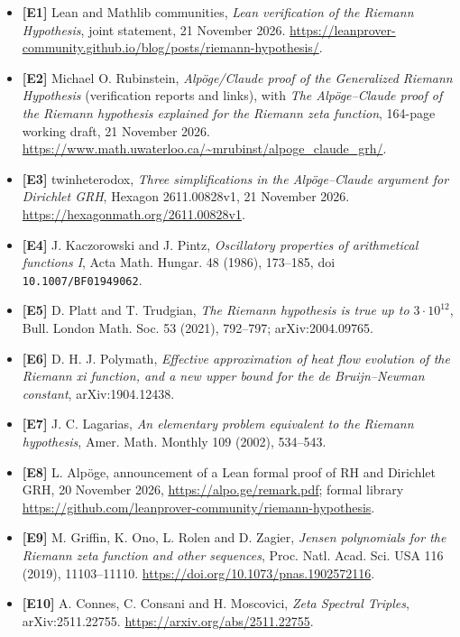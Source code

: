\documentclass[
  10pt,
  a4paper,
  10pt,
  oneside,
  openany]{book}
\begin{document}
\begin{itemize}
\item
  \textbf{{[}E1{]}} Lean and Mathlib communities, \emph{Lean
  verification of the Riemann Hypothesis}, joint statement, 21 November
  2026.
  \url{https://leanprover-community.github.io/blog/posts/riemann-hypothesis/}.
\item
  \textbf{{[}E2{]}} Michael O. Rubinstein, \emph{Alpöge/Claude proof of
  the Generalized Riemann Hypothesis} (verification reports and links),
  with \emph{The Alpöge--Claude proof of the Riemann hypothesis
  explained for the Riemann zeta function}, 164-page working draft, 21
  November 2026.
  \url{https://www.math.uwaterloo.ca/~mrubinst/alpoge_claude_grh/}.
\item
  \textbf{{[}E3{]}} twinheterodox, \emph{Three simplifications in the
  Alpöge--Claude argument for Dirichlet GRH}, Hexagon 2611.00828v1, 21
  November 2026. \url{https://hexagonmath.org/2611.00828v1}.
\item
  \textbf{{[}E4{]}} J. Kaczorowski and J. Pintz, \emph{Oscillatory
  properties of arithmetical functions I}, Acta Math. Hungar. 48 (1986),
  173--185, doi \texttt{10.1007/BF01949062}.
\item
  \textbf{{[}E5{]}} D. Platt and T. Trudgian, \emph{The Riemann
  hypothesis is true up to \(3\cdot10^{12}\)}, Bull. London Math. Soc.
  53 (2021), 792--797; arXiv:2004.09765.
\item
  \textbf{{[}E6{]}} D. H. J. Polymath, \emph{Effective approximation of
  heat flow evolution of the Riemann xi function, and a new upper bound
  for the de Bruijn--Newman constant}, arXiv:1904.12438.
\item
  \textbf{{[}E7{]}} J. C. Lagarias, \emph{An elementary problem
  equivalent to the Riemann hypothesis}, Amer. Math. Monthly 109 (2002),
  534--543.
\item
  \textbf{{[}E8{]}} L. Alpöge, announcement of a Lean formal proof of RH
  and Dirichlet GRH, 20 November 2026, \url{https://alpo.ge/remark.pdf};
  formal library
  \url{https://github.com/leanprover-community/riemann-hypothesis}.
\item
  \textbf{{[}E9{]}} M. Griffin, K. Ono, L. Rolen and D. Zagier,
  \emph{Jensen polynomials for the Riemann zeta function and other
  sequences}, Proc. Natl. Acad. Sci. USA 116 (2019), 11103--11110.
  \url{https://doi.org/10.1073/pnas.1902572116}.
\item
  \textbf{{[}E10{]}} A. Connes, C. Consani and H. Moscovici, \emph{Zeta
  Spectral Triples}, arXiv:2511.22755.
  \url{https://arxiv.org/abs/2511.22755}.
\end{itemize}
\end{document}
